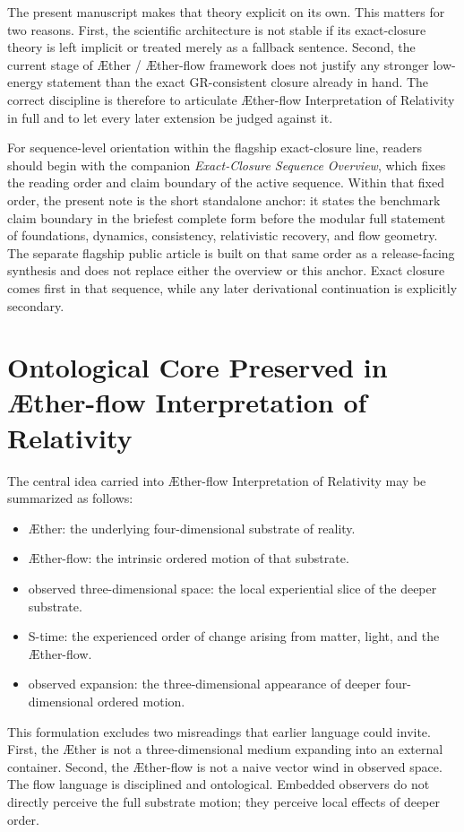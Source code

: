 \documentclass[11pt]{article}
\newcommand{\Aether}{\AE{}ther}
\newcommand{\Aflow}{\AE{}ther-flow}
\newcommand{\TheoryName}{\Aflow{} Interpretation of Relativity}
\newcommand{\TheoryProgram}{\Aether{} / \Aflow{} framework}
\begin{document}
The present manuscript makes that theory explicit on its own. This matters for two reasons. First, the scientific architecture is not stable if its exact-closure theory is left implicit or treated merely as a fallback sentence. Second, the current stage of \TheoryProgram{} does not justify any stronger low-energy statement than the exact GR-consistent closure already in hand. The correct discipline is therefore to articulate \TheoryName{} in full and to let every later extension be judged against it.

For sequence-level orientation within the flagship exact-closure line, readers should begin with the companion \emph{Exact-Closure Sequence Overview}, which fixes the reading order and claim boundary of the active sequence. Within that fixed order, the present note is the short standalone anchor: it states the benchmark claim boundary in the briefest complete form before the modular full statement of foundations, dynamics, consistency, relativistic recovery, and flow geometry. The separate flagship public article is built on that same order as a release-facing synthesis and does not replace either the overview or this anchor. Exact closure comes first in that sequence, while any later derivational continuation is explicitly secondary.



\section{Ontological Core Preserved in \TheoryName{}}

The central idea carried into \TheoryName{} may be summarized as follows:
\begin{itemize}
    \item \Aether{}: the underlying four-dimensional substrate of reality.
    \item \Aflow{}: the intrinsic ordered motion of that substrate.
    \item observed three-dimensional space: the local experiential slice of the deeper substrate.
    \item S-time: the experienced order of change arising from matter, light, and the \Aflow{}.
    \item observed expansion: the three-dimensional appearance of deeper four-dimensional ordered motion.
\end{itemize}

This formulation excludes two misreadings that earlier language could invite. First, the \Aether{} is not a three-dimensional medium expanding into an external container. Second, the \Aflow{} is not a naive vector wind in observed space. The flow language is disciplined and ontological. Embedded observers do not directly perceive the full substrate motion; they perceive local effects of deeper order.
\end{document}
